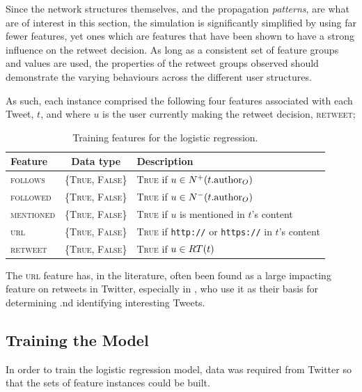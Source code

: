 Since the network structures themselves, and the propagation \textit{patterns}, are what are of interest in this section, the simulation is significantly simplified by using far fewer features, yet ones which are features that have been shown to have a strong influence on the retweet decision. As long as a consistent set of feature groups and values are used, the properties of the retweet groups observed should demonstrate the varying behaviours across the different user structures.

As such, each instance comprised the following four features associated with each Tweet, $t$, and where $u$ is the user currently making the retweet decision, \textsc{retweet};

\begin{table}[h]\footnotesize
\begin{center}
\begin{tabular}{ l | c | l }
	Feature & Data type & Description\\
	\hline
	\hline 
	\textsc{follows}    & \{\textsc{True, False}\} & \textsc{True} if $u \in N^+(t.\textrm{author}_O)$\\
    \textsc{followed}   & \{\textsc{True, False}\} & \textsc{True} if $u \in N^-(t.\textrm{author}_O)$\\
    \textsc{mentioned}  & \{\textsc{True, False}\} & \textsc{True} if $u$ is mentioned in $t$'s content\\
    \textsc{url}        & \{\textsc{True, False}\} & \textsc{True} if \texttt{http://} or \texttt{https://} in $t$'s content\\
    \hline 
    \textsc{retweet}    & \{\textsc{True, False}\} & \textsc{True} if $u \in RT(t)$\\ 
    \hline
\end{tabular}
\end{center}
\caption{Training features for the logistic regression.}
\label{table:logisticregressionfeatures}
\end{table}

The \textsc{url} feature has, in the literature, often been found as a large impacting feature on retweets in Twitter, especially in \cite{alonso10}, who use it as their basis for determining .nd identifying interesting Tweets.


\subsection{Training the Model}
In order to train the logistic regression model, data was required from Twitter so that the sets of feature instances could be built. 

